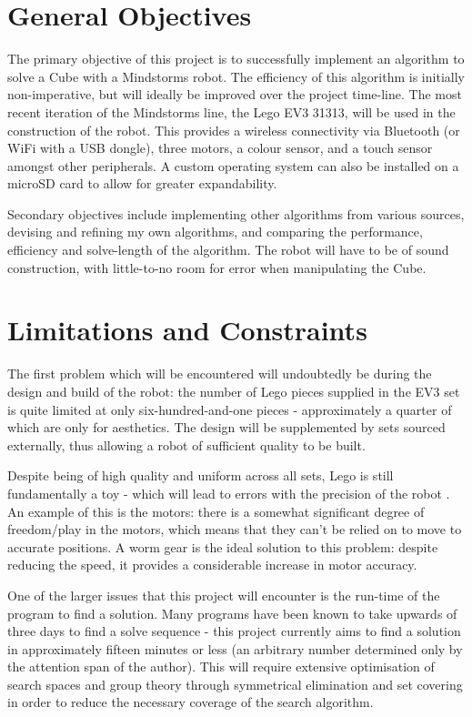 \documentclass{report}
\begin{document}
    \section{General Objectives}
    The primary objective of this project is to successfully implement an algorithm to solve a Cube with a Mindstorms robot. The efficiency of this algorithm is initially non-imperative, but will ideally be improved over the project time-line. The most recent iteration of the Mindstorms line, the Lego EV3 31313, will be used in the construction of the robot. This provides a wireless connectivity via Bluetooth (or WiFi with a USB dongle), three motors, a colour sensor, and a touch sensor amongst other peripherals. A custom operating system can also be installed on a microSD card to allow for greater expandability.
    
    Secondary objectives include implementing other algorithms from various sources, devising and refining my own algorithms, and comparing the performance, efficiency and solve-length of the algorithm. The robot will have to be of sound construction, with little-to-no room for error when manipulating the Cube.
    
    \section{Limitations and Constraints}
    The first problem which will be encountered will undoubtedly be during the design and build of the robot: the number of Lego pieces supplied in the EV3 set is quite limited at only six-hundred-and-one pieces - approximately a quarter of which are only for aesthetics. The design will be supplemented by sets sourced externally, thus allowing a robot of sufficient quality to be built.
    
    Despite being of high quality and uniform across all sets, Lego is still fundamentally a toy - which will lead to errors with the precision of the robot \cite{Cook2017}. An example of this is the motors: there is a somewhat significant degree of freedom/play in the motors, which means that they can't be relied on to move to accurate positions. A worm gear is the ideal solution to this problem: despite reducing the speed, it provides a considerable increase in motor accuracy.
    
    One of the larger issues that this project will encounter is the run-time of the program to find a solution. Many programs have been known to take upwards of three days to find a solve sequence - this project currently aims to find a solution in approximately fifteen minutes or less (an arbitrary number determined only by the attention span of the author). This will require extensive optimisation of search spaces and group theory through symmetrical elimination and set covering in order to reduce the necessary coverage of the search algorithm.
    
\end{document}
